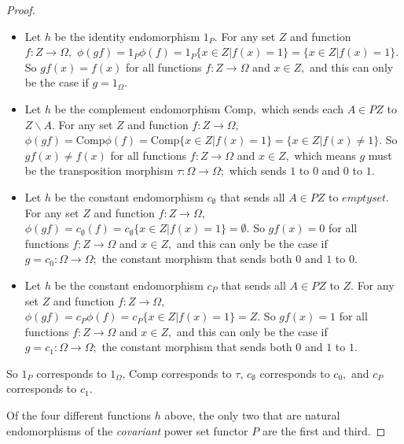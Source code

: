 \documentclass[../../main]{subfiles}
\begin{document}
\begin{proof}
	\begin{itemize}
		\item Let $ h $ be the identity endomorphism $ 1_P $. For any
			set $ Z $ and function $ f\colon Z \to \Omega, $ $ \phi(gf)
			= 1_P\phi(f) = 1_P\{x \in Z | f(x) = 1\} = \{x \in Z |
			f(x) = 1\}. $ So $ gf(x) = f(x) $ for all functions $
			f\colon Z \to \Omega $ and $ x \in Z, $ and this can only be
			the case if $ g = 1_\Omega. $
		\item Let $ h $ be the complement endomorphism $ \mathrm{Comp},
			$ which sends each $ A\in PZ $ to $ Z\backslash A $.
			For any set $ Z $ and function $ f\colon Z \to \Omega, $ $
			\phi(gf) = \mathrm{Comp}\phi(f) = \mathrm{Comp}\{x \in
			Z | f(x) = 1\} = \{x \in Z | f(x) \neq 1\}. $ So $
			gf(x) \neq f(x) $ for all functions $ f\colon Z \to \Omega $
			and $ x \in Z, $ which means $ g $ must be the
			transposition morphism $ \tau\colon\Omega \to \Omega; $
			which sends $ 1 $ to $ 0 $ and $ 0 $ to $ 1 $.
		\item Let $ h $ be the constant endomorphism $ c_\emptyset $
			that sends all $ A\in PZ $ to $ emptyset. $ For any set
			$ Z $ and function $ f\colon Z \to \Omega, $ $ \phi(gf) =
			c_\emptyset(f) = c_\emptyset\{x \in Z | f(x) = 1\} =
			\emptyset. $ So $ gf(x) = 0 $ for all functions $ f\colon Z
			\to \Omega $ and $ x \in Z, $  and this can only be the
			case if $ g = c_0\colon\Omega \to \Omega; $ the constant
			morphism that sends both $ 0 $ and $ 1 $ to $ 0. $ 
		\item Let $ h $ be the constant endomorphism $ c_P $ that sends
			all $ A\in PZ $ to $ Z. $ For any set $ Z $ and
			function $ f\colon Z \to \Omega, $ $ \phi(gf) = c_P\phi(f) =
			c_P\{x \in Z | f(x) = 1\} = Z. $ So $ gf(x) = 1 $ for
			all functions $ f\colon Z \to \Omega $ and $ x \in Z, $  and
			this can only be the case if $ g = c_1\colon\Omega \to
			\Omega; $ the constant morphism that sends both $ 0 $
			and $ 1 $ to $ 1. $
	\end{itemize}

	So $ 1_P $ corresponds to $ 1_\Omega $, $ \mathrm{Comp} $ corresponds
	to $ \tau $, $ c_\emptyset $ corresponds to $ c_0, $ and $ c_P $
	corresponds to $ c_1 $.


	Of the four different functions $h$ above, the only two that are natural
	endomorphisms of the \emph{covariant} power set functor $P$ are the first
	and third.


\end{proof}
\end{document}
